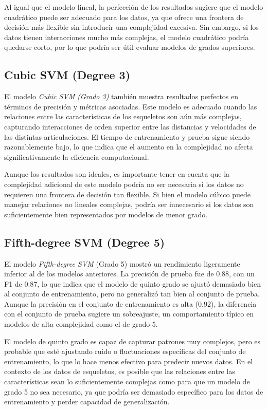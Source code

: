 Al igual que el modelo lineal, la perfección de los resultados sugiere que el modelo cuadrático puede ser adecuado para los datos, ya que ofrece una frontera de decisión más flexible sin introducir una complejidad excesiva. Sin embargo, si los datos tienen interacciones mucho más complejas, el modelo cuadrático podría quedarse corto, por lo que podría ser útil evaluar modelos de grados superiores.

\subsection{Cubic SVM (Degree 3)}
El modelo \textit{Cubic SVM (Grado 3)} también muestra resultados perfectos en términos de precisión y métricas asociadas. Este modelo es adecuado cuando las relaciones entre las características de los esqueletos son aún más complejas, capturando interacciones de orden superior entre las distancias y velocidades de las distintas articulaciones. El tiempo de entrenamiento y prueba sigue siendo razonablemente bajo, lo que indica que el aumento en la complejidad no afecta significativamente la eficiencia computacional.

Aunque los resultados son ideales, es importante tener en cuenta que la complejidad adicional de este modelo podría no ser necesaria si los datos no requieren una frontera de decisión tan flexible. Si bien el modelo cúbico puede manejar relaciones no lineales complejas, podría ser innecesario si los datos son suficientemente bien representados por modelos de menor grado.

\subsection{Fifth-degree SVM (Degree 5)}
El modelo \textit{Fifth-degree SVM} (Grado 5) mostró un rendimiento ligeramente inferior al de los modelos anteriores. La precisión de prueba fue de 0.88, con un F1 de 0.87, lo que indica que el modelo de quinto grado se ajustó demasiado bien al conjunto de entrenamiento, pero no generalizó tan bien al conjunto de prueba. Aunque la precisión en el conjunto de entrenamiento es alta (0.92), la diferencia con el conjunto de prueba sugiere un sobreajuste, un comportamiento típico en modelos de alta complejidad como el de grado 5.

El modelo de quinto grado es capaz de capturar patrones muy complejos, pero es probable que esté ajustando ruido o fluctuaciones específicas del conjunto de entrenamiento, lo que lo hace menos efectivo para predecir nuevos datos. En el contexto de los datos de esqueletos, es posible que las relaciones entre las características sean lo suficientemente complejas como para que un modelo de grado 5 no sea necesario, ya que podría ser demasiado específico para los datos de entrenamiento y perder capacidad de generalización.

